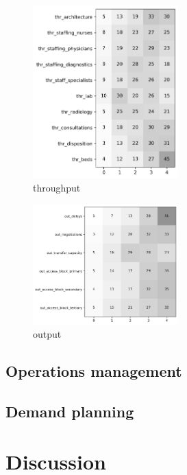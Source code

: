 \documentclass{article}
\begin{document}
\begin{figure}[H]
    \centering
        \includegraphics[width=0.5\textwidth]{../output/plots/throughput}
        \caption{throughput}
        \label{fig:throughput}
\end{figure}

\begin{figure}[H]
    \centering
        \includegraphics[width=0.5\textwidth]{../output/plots/output}
        \caption{output}
        \label{fig:output}
\end{figure}

\subsection{Operations management}

\subsection{Demand planning}


\section{Discussion}
\lipsum[5]
\end{document}
